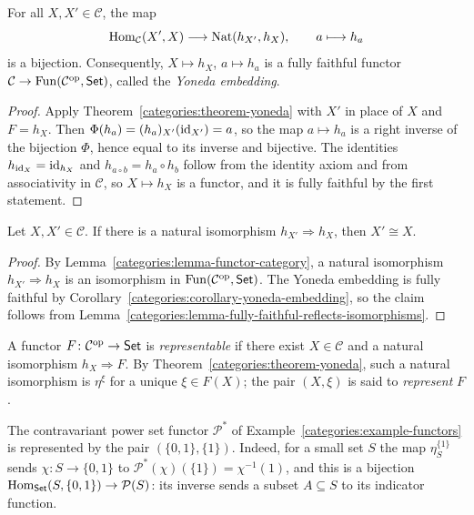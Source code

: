 \begin{corollary}\label{categories:corollary-yoneda-embedding}
For all $X, X' \in \mathcal{C}$, the map
\[
\operatorname{Hom}_{\mathcal{C}}(X', X) \longrightarrow \operatorname{Nat}(h_{X'}, h_X), \qquad
a \longmapsto h_a
\]
is a bijection. Consequently, $X \mapsto h_X$, $a \mapsto h_a$ is a fully
faithful functor $\mathcal{C} \to \operatorname{Fun}(\mathcal{C}^{\mathrm{op}}, \mathsf{Set})$, called the
\emph{Yoneda embedding}.
\end{corollary}

\begin{proof}
Apply Theorem~\ref{categories:theorem-yoneda} with $X'$ in place of $X$ and
$F = h_X$. Then $\Phi(h_a) = (h_a)_{X'}(\mathrm{id}_{X'}) = a$, so the map
$a \mapsto h_a$ is a right inverse of the bijection $\Phi$, hence equal to its
inverse and bijective. The identities $h_{\mathrm{id}_X} = \mathrm{id}_{h_X}$ and
$h_{a \circ b} = h_a \circ h_b$ follow from the identity axiom and from
associativity in $\mathcal{C}$, so $X \mapsto h_X$ is a functor, and it is
fully faithful by the first statement.
\end{proof}

\begin{corollary}\label{categories:corollary-yoneda-isomorphism}
Let $X, X' \in \mathcal{C}$. If there is a natural isomorphism
$h_{X'} \Rightarrow h_X$, then $X' \cong X$.
\end{corollary}

\begin{proof}
By Lemma~\ref{categories:lemma-functor-category}, a natural isomorphism
$h_{X'} \Rightarrow h_X$ is an isomorphism in $\operatorname{Fun}(\mathcal{C}^{\mathrm{op}}, \mathsf{Set})$.
The Yoneda embedding is fully faithful by
Corollary~\ref{categories:corollary-yoneda-embedding}, so the claim follows
from Lemma~\ref{categories:lemma-fully-faithful-reflects-isomorphisms}.
\end{proof}

\begin{definition}\label{categories:definition-representable}
A functor $F \colon \mathcal{C}^{\mathrm{op}} \to \mathsf{Set}$ is \emph{representable} if
there exist $X \in \mathcal{C}$ and a natural isomorphism $h_X \Rightarrow F$.
By Theorem~\ref{categories:theorem-yoneda}, such a natural isomorphism is
$\eta^\xi$ for a unique $\xi \in F(X)$; the pair $(X, \xi)$ is said to
\emph{represent} $F$.
\end{definition}

\begin{example}\label{categories:example-power-set-representable}
The contravariant power set functor $\mathcal{P}^*$ of
Example~\ref{categories:example-functors} is represented by the pair
$(\{0, 1\}, \{1\})$. Indeed, for a small set $S$ the map $\eta^{\{1\}}_S$ sends
$\chi \colon S \to \{0, 1\}$ to $\mathcal{P}^*(\chi)(\{1\}) = \chi^{-1}(1)$, and
this is a bijection $\operatorname{Hom}_{\mathsf{Set}}(S, \{0, 1\}) \to \mathcal{P}(S)$: its inverse
sends a subset $A \subseteq S$ to its indicator function.
\end{example}


